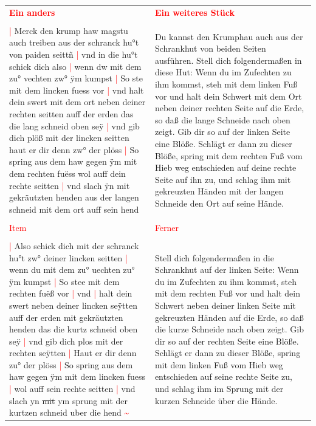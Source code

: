 \begin{longtable}{p{6.25cm}p{6.25cm}}
    \textbf{\textcolor{red}{
        Ein anders}}
    &
    \textbf{\textcolor{red}{
        Ein weiteres Stück}}
    \\
    \\
    \textcolor{red}{|} Merck den krump haw magstu auch treiben aus der schranck hu°t von paiden seittñ
    \textcolor{red}{|} vnd in die hu°t schick dich also
    \textcolor{red}{|} wenn dw mit dem zu° vechten zw° ÿm kumpst
    \textcolor{red}{|} So ste mit dem lincken fuess vor
    \textcolor{red}{|} vnd halt dein swert mit dem ort neben deiner rechten seitten auff der erden das die lang schneid oben seÿ
    \textcolor{red}{|} vnd gib dich plöß mit der lincken seitten haut er dir denn zw° der plöss
    \textcolor{red}{|} So spring aus dem haw gegen ÿm mit dem rechten fuëss wol auff dein rechte seitten
    \textcolor{red}{|} vnd slach ÿn mit gekräutzten henden aus der langen schneid mit dem ort auff sein hend
    &
    Du kannst den Krumphau auch aus der Schrankhut von beiden Seiten ausführen.
    Stell dich folgendermaßen in diese Hut: Wenn du im Zufechten zu ihm kommst, steh mit dem linken Fuß vor und halt dein Schwert mit dem Ort neben deiner rechten Seite auf die Erde, so daß die lange Schneide nach oben zeigt.
    Gib dir so auf der linken Seite eine Blöße.
    Schlägt er dann zu dieser Blöße, spring mit dem rechten Fuß vom Hieb weg entschieden auf deine rechte Seite auf ihn zu, und schlag ihm mit gekreuzten Händen mit der langen Schneide den Ort auf seine Hände.
    \\
    \\
    \textcolor{red}{
        Item}
    &
    \textcolor{red}{
        Ferner}
    \\
    \\
    \textcolor{red}{|} Also schick dich mit der schranck hu°t zw° deiner lincken seitten
    \textcolor{red}{|} wenn du mit dem zu° uechten zu° ÿm kumpst
    \textcolor{red}{|} So stee mit dem rechten fuëß vor
    \textcolor{red}{|} vnd
    \textcolor{red}{|} halt dein swert neben deiner lincken seÿtten auff der erden mit gekräutzten henden das die kurtz schneid oben seÿ
    \textcolor{red}{|} vnd gib dich plos mit der rechten seÿtten
    \textcolor{red}{|} Haut er dir denn zu° der plöss
    \textcolor{red}{|} So spring aus dem haw gegen ÿm mit dem lincken fuess
    \textcolor{red}{|} wol auff sein rechte seitten
    \textcolor{red}{|} vnd slach yn \st{mit} ym sprung mit der kurtzen schneid uber die hend \textcolor{red}{\textasciitilde{}}
    &
    Stell dich folgendermaßen in die Schrankhut auf der linken Seite: Wenn du im Zufechten zu ihm kommst, steh mit dem rechten Fuß vor und halt dein Schwert neben deiner linken Seite mit gekreuzten Händen auf die Erde, so daß die kurze Schneide nach oben zeigt.
    Gib dir so auf der rechten Seite eine Blöße.
    Schlägt er dann zu dieser Blöße, spring mit dem linken Fuß vom Hieb weg entschieden auf seine rechte Seite zu, und schlag ihm im Sprung mit der kurzen Schneide über die Hände.
\end{longtable}

